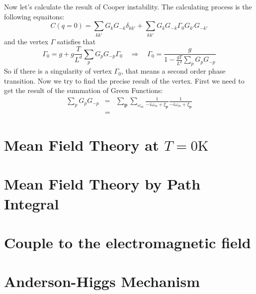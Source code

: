 \documentclass{article}
\newcommand{\mtp}{\mathbf{p}}
\begin{document}
Now let's calculate the result of Cooper instability. The calculating process is the following equaitons:
\begin{equation}
C(q=0) =\sum_{kk'} G_k G_{-k}\delta_{kk'} + \sum_{kk'}G_{k}G_{-k}\Gamma_0 G_{k'}G_{-k'}
\end{equation}
and the vertex $\Gamma$ satisfies that
$$
\Gamma_0 = g + g\frac{T}{L^d}\sum_{p}G_{p}G_{-p}\Gamma_0 \quad\Rightarrow\quad \Gamma_0 = \frac{g}{1-\frac{gT}{L^d}\sum_{p}G_p G_{-p}}
$$
So if there is a singularity of vertex $\Gamma_0$, that means a second order phase transition. Now we try to find the precise result of the vertex. First we need to get the result of the summation of Green Functions:
\begin{eqnarray}
\sum_p G_p G_{-p} &=& \sum_{\mtp}\sum_{\omega_m}\frac{1}{-i\omega_m +\xi_\mtp}\frac{1}{-i\omega_m + \xi_\mtp}\nonumber\\
&=& 
\end{eqnarray}

\section{Mean Field Theory at $T = 0\mathrm{K}$}

\section{Mean Field Theory by Path Integral}

\section{Couple to the electromagnetic field}

\section{Anderson-Higgs Mechanism}
\end{document}
